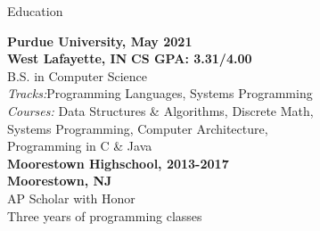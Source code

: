 \vspace{5.5cm}
\begin{center}
{\fontsize{24}{50}\selectfont Education}\\
\end{center}
\footnotesize
\raggedright
\textbf{Purdue University,
\hfill \textbf{May 2021}\\
West Lafayette, IN}
\hfill \textbf{CS GPA: 3.31/4.00}\\
\hspace{.5cm}  B.S. in Computer Science\\
\hspace{0.75cm}  \textit{Tracks:}\hspace{0.32cm}Programming Languages, Systems Programming\\
\vspace{5pt}
\hspace{0.75cm}  \textit{Courses:} Data Structures \& Algorithms, Discrete Math,\\
\hspace{2.65cm}Systems Programming, Computer Architecture,\\
\hspace{2.65cm}Programming in C \& Java\\
\vspace{5pt}
\textbf{Moorestown Highschool,
\hfill \textbf{2013-2017}\\
Moorestown, NJ}\\
\hspace{0.75cm}  AP Scholar with Honor\\
\hspace{0.75cm}  Three years of programming classes\\